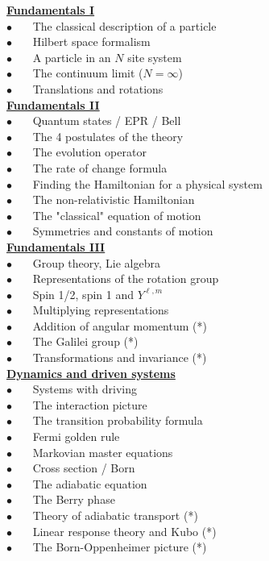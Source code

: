 \documentclass[onecolumn,fleqn]{revtex4}
\newcommand{\bitem}{$\bullet$ \ \ \ }
\newcommand{\mpgt}[2][1.0\hsize]{\begin{minipage}[t]{#1}{#2}\end{minipage}}
\begin{document}
\mpgt[0.48\hsize]{

\hyperlink{shdA1.1}{\bf Fundamentals I} \\

\bitem The classical description of a particle  \\
\bitem Hilbert space formalism  \\
\bitem A particle in an $N$ site system  \\
\bitem The continuum limit ($N=\infty$) \\
\bitem Translations and rotations \\

\hyperlink{shdA2.1}{\bf Fundamentals II} \\

\bitem Quantum states / EPR / Bell \\
\bitem The 4 postulates of the theory   \\
\bitem The evolution operator \\
\bitem The rate of change formula \\
\bitem Finding the Hamiltonian for a physical system \\
\bitem The non-relativistic Hamiltonian \\
\bitem The "classical" equation of motion \\
\bitem Symmetries and constants of motion \\

\hyperlink{shdA3.1}{\bf Fundamentals III} \\

\bitem Group theory, Lie algebra \\
\bitem Representations of the rotation group \\
\bitem Spin 1/2, spin 1 and $Y^{\ell,m}$ \\
\bitem Multiplying representations \\
\bitem Addition of angular momentum (*) \\
\bitem The Galilei group (*) \\
\bitem Transformations and invariance (*) \\


\hyperlink{shdA4.1}{\bf Dynamics and driven systems} \\

\bitem Systems with driving \\ 
\bitem The interaction picture \\
\bitem The transition probability formula \\ 
\bitem Fermi golden rule \\
\bitem Markovian master equations \\
\bitem Cross section / Born \\

\bitem The adiabatic equation \\
\bitem The Berry phase \\
\bitem Theory of adiabatic transport (*) \\
\bitem Linear response theory and Kubo (*) \\
\bitem The Born-Oppenheimer picture (*) 

}
\end{document}

